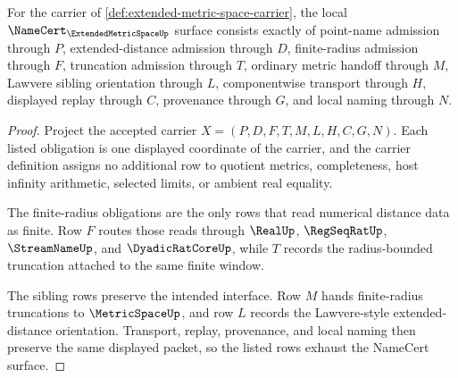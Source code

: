 \begin{theorem}
\label{thm:extended-metric-space-namecert-obligations}
For the carrier of \autoref{def:extended-metric-space-carrier}, the local $\NameCert_{\ExtendedMetricSpaceUp}$ surface consists exactly of point-name admission through $P$, extended-distance admission through $D$, finite-radius admission through $F$, truncation admission through $T$, ordinary metric handoff through $M$, Lawvere sibling orientation through $L$, componentwise transport through $H$, displayed replay through $C$, provenance through $G$, and local naming through $N$.
\end{theorem}
\begin{proof}
Project the accepted carrier $X=(P,D,F,T,M,L,H,C,G,N)$. Each listed obligation is one displayed coordinate of the carrier, and the carrier definition assigns no additional row to quotient metrics, completeness, host infinity arithmetic, selected limits, or ambient real equality.

The finite-radius obligations are the only rows that read numerical distance data as finite. Row $F$ routes those reads through $\RealUp$, $\RegSeqRatUp$, $\StreamNameUp$, and $\DyadicRatCoreUp$, while $T$ records the radius-bounded truncation attached to the same finite window.

The sibling rows preserve the intended interface. Row $M$ hands finite-radius truncations to $\MetricSpaceUp$, and row $L$ records the Lawvere-style extended-distance orientation. Transport, replay, provenance, and local naming then preserve the same displayed packet, so the listed rows exhaust the NameCert surface.
\end{proof}

